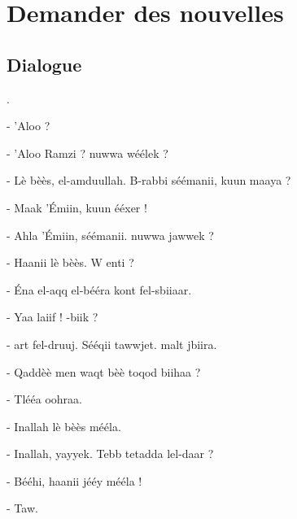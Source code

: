 \chapter{Demander des nouvelles}

\section{Dialogue}
.\newline

- 'Aloo ? 

- 'Aloo Ramzi ? \VS nuwwa \hb wéélek ?

- Lè bèès, el-\hb amduullah. B-rabbi sééma\hb nii, \vs kuun m\ca aaya ? 

- M\ca aak 'Émiin, \vs kuun ééxer !

- Ahla 'Émiin, sééma\hb nii. \VS nuwwa jawwek ?

- Haanii lè bèès. W enti ? 

- Éna el-\hb aqq el-bééra\hb{} kont fel-sbii\ct aar. 

- Yaa la\ct iif ! \VS -biik ? 

- \CA\th art fel-druuj. Sééqii t\ca awwjet. \CA malt jbiira.

- Qaddèè\vs{} men waqt bèè\vs{} toq\ca od biihaa ? 

- Tléé\th a o\vs ohraa.

- In\vs allah lè bèès mééla. 

- In\vs allah, y\ca ayy\vs ek. T\hb ebb tet\ca adda lel-daar ? 

- Bééhi, haanii jééy mééla ! 

- T\vs aw. 